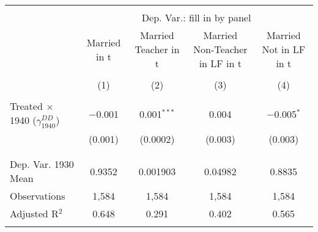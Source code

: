 
\begin{tabular}{@{\extracolsep{5pt}}lcccc} 
\\[-1.8ex]\hline 
\hline \\[-1.8ex] 
 & \multicolumn{4}{c}{Dep. Var.: fill in by panel} \\ 
\cline{2-5} 
 & Married in t & Married Teacher in t & Married Non-Teacher in LF in t & Married Not in LF in t \\ 
\\[-1.8ex] & (1) & (2) & (3) & (4)\\ 
\hline \\[-1.8ex] 
 Treated $\times$ 1940 ($\gamma_{1940}^{DD}$) & $-$0.001 & 0.001$^{***}$ & 0.004 & $-$0.005$^{*}$ \\ 
  & (0.001) & (0.0002) & (0.003) & (0.003) \\ 
  & & & & \\ 
\hline \\[-1.8ex] 
Dep. Var. 1930 Mean & 0.9352 & 0.001903 & 0.04982 & 0.8835 \\ 
Observations & 1,584 & 1,584 & 1,584 & 1,584 \\ 
Adjusted R$^{2}$ & 0.648 & 0.291 & 0.402 & 0.565 \\ 
\hline 
\hline \\[-1.8ex] 
\end{tabular} 
